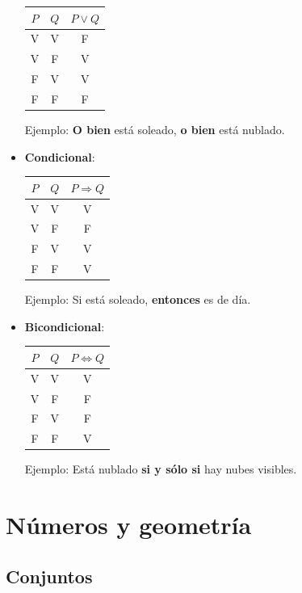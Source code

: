 \begin{definition}
\begin{itemize}
\begin{tabular}{ |c|c|c| }
\hline
$P$ & $Q$ & $P \vee Q$  \\
\hline  
V & V & F  \\
V & F & V  \\
F & V & V  \\
F & F & F  \\
\hline
\end{tabular}

Ejemplo: \textbf{O bien} está soleado, \textbf{o bien} está nublado.

\item \textbf{Condicional}: 

\begin{tabular}{ |c|c|c| }
\hline
$P$ & $Q$ & $P \Rightarrow Q$  \\
\hline  
V & V & V  \\
V & F & F  \\
F & V & V  \\
F & F & V  \\
\hline
\end{tabular}

Ejemplo: Si está soleado, \textbf{entonces} es de día.

\item \textbf{Bicondicional}: 

\begin{tabular}{ |c|c|c| }
\hline
$P$ & $Q$ & $P \Leftrightarrow Q$  \\
\hline  
V & V & V  \\
V & F & F  \\
F & V & F  \\
F & F & V  \\
\hline
\end{tabular}

Ejemplo: Está nublado \textbf{si y sólo si} hay nubes visibles.

\end{itemize}

\end{definition}



\chapter{Números y geometría}

\section{Conjuntos}

